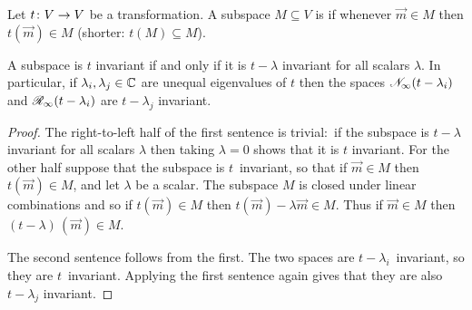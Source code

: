\begin{definition} \label{def:invariant}
Let \( \mbox{$t\colon V\to V$} \) be a transformation.
A subspace \( M\subseteq V \) is %
if whenever \( \vec{m}\in M \) then \( t(\vec{m})\in M \)
(shorter: \( t(M)\subseteq M \)).
\end{definition}

\begin{lemma} \label{le:tInvIfftMinLambdaInv}
A subspace is \( t \) invariant if and only if 
it is \( t-\lambda \) invariant for all scalars \( \lambda \).
In particular, 
if \( \lambda_i,\lambda_j\in\mathbb{C} \) are unequal eigenvalues of
\( t \) then
the spaces \( \mathscr{N}_\infty(t-\lambda_i) \) 
and \( \mathscr{R}_\infty(t-\lambda_i) \)
are \( t-\lambda_j \) invariant.
\end{lemma}

\begin{proof}
The right-to-left half of the first sentence is trivial:~if 
the subspace is $t-\lambda$ invariant for 
all scalars $\lambda$ then taking $\lambda=0$ 
shows that it is $t$ invariant.
For the other half suppose that the subspace is $t$~invariant,
so that if $\vec{m}\in M$ then $t(\vec{m})\in M$, and let $\lambda$ be 
a scalar.
The subspace $M$ is closed under linear combinations and so if 
$t(\vec{m})\in M$ then $t(\vec{m})-\lambda\vec{m}\in M$.
Thus if $\vec{m}\in M$ then $(t-\lambda)\,(\vec{m})\in M$.

The second sentence follows from the first.
The
two spaces are $t-\lambda_i$~invariant, so they are \( t \)~invariant.
Applying the first sentence again gives that 
they are also \( t-\lambda_j \) invariant.
\end{proof}

